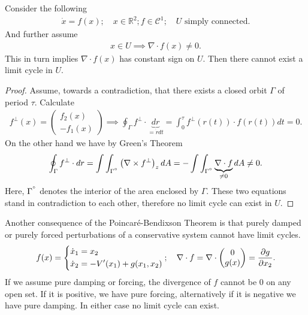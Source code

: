 \begin{proposition}
	Consider the following
	\begin{align}
		\dot{x}	= f(x);\quad x\in \mathbb{R}^{2}; f\in \mathcal{C}^{1};\quad U  \textrm{ simply connected} .
	\end{align}
And further assume 
 \begin{align}
	  x\in U \implies  \nabla \cdot  f(x) \neq 0.
\end{align}
This in turn implies $\nabla \cdot f(x)$ has constant sign on $U$. Then there cannot exist a limit cycle in $U$.
\end{proposition}
\begin{proof}
	Assume, towards a contradiction, that there exists a closed orbit $\Gamma$ of period $\tau$. Calculate 
	\begin{align}
	f^{\perp}(x) =
	\begin{pmatrix}
		f_2(x) \\ -f_1(x)
	\end{pmatrix}
	\implies \oint_{\Gamma }f^{\perp}\cdot \underbrace{dr}_{=\dot{r}dt}
	=\int_{0}^{\tau} f^{\perp}(r(t)) \cdot f(r(t)) dt = 0.
	\end{align}
On the other hand we have by Green's Theorem
\begin{align}
	\oint_{\Gamma }f^{\perp}\cdot dr = \int \int_{\Gamma^{\degree}} \left(\nabla \times f^{\perp}\right)_{z}dA = - \int \int_{\Gamma^{\degree}} \underbrace{\nabla \cdot f}_{\neq 0}dA \neq 0.
\end{align}
Here, $\Gamma^{\degree}$ denotes the interior of the area enclosed by $\Gamma$. These two equations stand in contradiction to each other, therefore no limit cycle can exist in $U$. 
\end{proof}
\begin{remark}[]
	Another consequence of the Poincaré-Bendixson Theorem is that purely damped or purely forced perturbations of a conservative system cannot have limit cycles. 
	\begin{align}
		f(x) =
		\begin{dcases}
			\dot{x}_1 = x_2 \\
			\dot{x}_2 = -V'(x_1) + g(x_1, x_2)
		\end{dcases}
		;\quad 
		\nabla \cdot f = \nabla \cdot
		\begin{pmatrix}
			0 \\ g(x)
		\end{pmatrix}
		=\frac{\partial g}{\partial x_2}.
	\end{align}
	If we assume pure damping or forcing, the divergence of $f$ cannot be 0 on any open set. If it is positive, we have pure forcing, alternatively if it is negative we have pure damping. In either case no limit cycle can exist.	
\end{remark}

